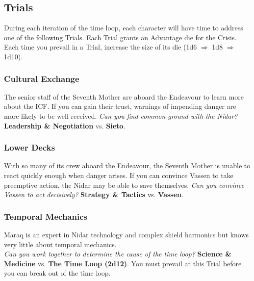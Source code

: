 \documentclass[11pt, a5paper, parskip=half-, DIV=12]{scrartcl}
\begin{document}
\newpage

\subsection*{Trials}
During each iteration of the time loop, each character will have time to address one of the following Trials.
Each Trial grants an Advantage die for the Crisis. Each time you prevail in a Trial, increase the size of its die (1d6 $\Longrightarrow$ 1d8 $\Longrightarrow$ 1d10). 

\subsubsection*{Cultural Exchange}
The senior staff of the Seventh Mother
are aboard the Endeavour to learn more about the ICF.
If you can gain their trust, warnings of impending danger are more likely to be well received. \textit{Can you find common ground with the Nidar?} \textbf{Leadership \& Negotiation} vs. \textbf{Sieto}.

\subsubsection*{Lower Decks}
With so many of its crew aboard the Endeavour, the Seventh Mother is unable to react quickly enough when danger arises. If you can convince Vassen to take preemptive action, the Nidar may be able to save themselves. \textit{Can you convince Vassen to act decisively?} \textbf{Strategy \& Tactics} vs. \textbf{Vassen}.

\subsubsection*{Temporal Mechanics}
Maraq is an expert in Nidar technology and complex shield harmonics but knows very little about temporal mechanics.
\\ \textit{Can you work together to determine the cause of the time loop?} \textbf{Science \& Medicine} vs. \textbf{The Time Loop (2d12)}. You must prevail at this Trial before you can break out of the time loop.
\end{document}
